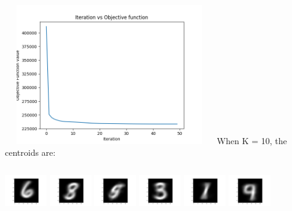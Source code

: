 \documentclass{article}
\begin{document}
\includegraphics[width=9cm, height=6cm]{plots/A4/A4b.png} \newline
When K = 10, the centroids are:

\includegraphics[width=1.8cm, height=2cm]{plots/A4/A4b_0.png}
\includegraphics[width=1.8cm, height=2cm]{plots/A4/A4b_1.png}
\includegraphics[width=1.8cm, height=2cm]{plots/A4/A4b_2.png}
\includegraphics[width=1.8cm, height=2cm]{plots/A4/A4b_3.png}
\includegraphics[width=1.8cm, height=2cm]{plots/A4/A4b_4.png}
\includegraphics[width=1.8cm, height=2cm]{plots/A4/A4b_5.png}
\end{document}
